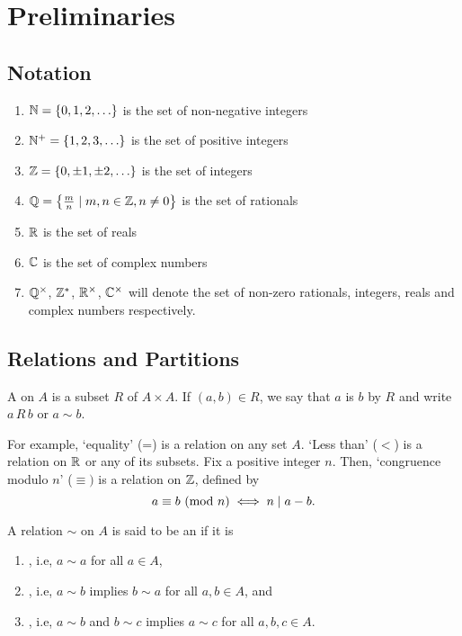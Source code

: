 \section{Preliminaries}

\subsection{Notation}

\begin{enumerate}
    \item $\mathbb{N} = \{ 0, 1, 2, \ldots \}$ is the set of non-negative integers
    \item $\mathbb{N}^+ = \{ 1, 2, 3, \ldots \}$ is the set of positive integers
    \item $\mathbb{Z} = \{ 0, \pm 1, \pm 2, \ldots \}$ is the set of integers
    \item $\mathbb{Q} = \left\{ \frac{m}{n} \mid m,n \in \mathbb{Z}, n \neq 0 \right\}$ is the set of rationals
    \item $\mathbb{R}$ is the set of reals
    \item $\mathbb{C}$ is the set of complex numbers
    \item $\mathbb{Q}^{\times}$, $\mathbb{Z}^{\ast}$, $\mathbb{R}^{\times}$, $\mathbb{C}^{\times}$ will denote the set of non-zero rationals, integers, reals and complex numbers respectively.
\end{enumerate}

\subsection{Relations and Partitions}

\begin{defn}
    A  on $A$ is a subset $R$ of $A \times A$. If $(a,b) \in R$, we say that $a$ is  $b$ by $R$ and write $a \, R \, b$ or $a \sim  b$.
\end{defn}

For example, `equality' (=) is a relation on any set $A$. `Less than' ($<$) is a relation on $\mathbb{R}$ or any of its subsets. Fix a positive integer $n$. Then, `congruence modulo $n$' ($\equiv)$ is a relation on $\mathbb{Z}$, defined by 
\[
    a \equiv b \ (\mathrm{mod}\ n) \iff n \mid a-b.
\]

\begin{defn}
    A relation $\sim$ on $A$ is said to be an  if it is
    \begin{enumerate}
        \item {}, i.e, $a \sim a$ for all $a \in A$,
        \item {}, i.e, $a \sim b$ implies $b \sim a$ for all $a,b \in A$, and
        \item {}, i.e, $a \sim b$ and $b \sim c$ implies $a \sim c$ for all $a,b,c \in A$.
    \end{enumerate}
\end{defn}

